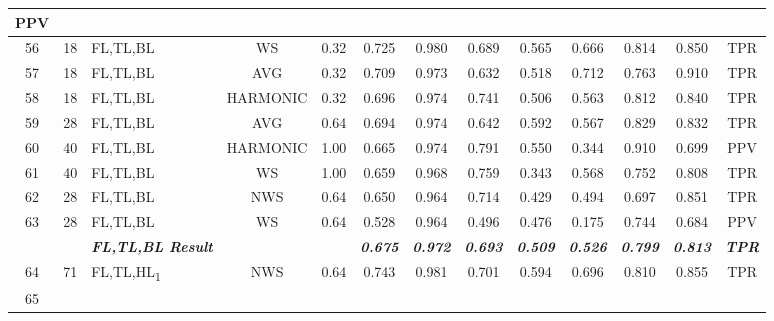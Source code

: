 \begin{table}[H]
{\begin{tabular}{cc|l|cc|c|c|c|c|c|c|c|c|}
    PPV \\ \hline
  \multicolumn{1}{|c|}{56} &
    18 &
    FL,TL,BL &
    \multicolumn{1}{c|}{WS} &
    0.32 &
    0.725 &
    0.980 &
    0.689 &
    0.565 &
    0.666 &
    0.814 &
    0.850 &
    TPR \\ \hline
  \multicolumn{1}{|c|}{57} &
    18 &
    FL,TL,BL &
    \multicolumn{1}{c|}{AVG} &
    0.32 &
    0.709 &
    0.973 &
    0.632 &
    0.518 &
    0.712 &
    0.763 &
    0.910 &
    TPR \\ \hline
  \multicolumn{1}{|c|}{58} &
    18 &
    FL,TL,BL &
    \multicolumn{1}{c|}{HARMONIC} &
    0.32 &
    0.696 &
    0.974 &
    0.741 &
    0.506 &
    0.563 &
    0.812 &
    0.840 &
    TPR \\ \hline
  \multicolumn{1}{|c|}{59} &
    28 &
    FL,TL,BL &
    \multicolumn{1}{c|}{AVG} &
    0.64 &
    0.694 &
    0.974 &
    0.642 &
    0.592 &
    0.567 &
    0.829 &
    0.832 &
    TPR \\ \hline
  \multicolumn{1}{|c|}{60} &
    40 &
    FL,TL,BL &
    \multicolumn{1}{c|}{HARMONIC} &
    1.00 &
    0.665 &
    0.974 &
    0.791 &
    0.550 &
    0.344 &
    0.910 &
    0.699 &
    PPV \\ \hline
  \multicolumn{1}{|c|}{61} &
    40 &
    FL,TL,BL &
    \multicolumn{1}{c|}{WS} &
    1.00 &
    0.659 &
    0.968 &
    0.759 &
    0.343 &
    0.568 &
    0.752 &
    0.808 &
    TPR \\ \hline
  \multicolumn{1}{|c|}{62} &
    28 &
    FL,TL,BL &
    \multicolumn{1}{c|}{NWS} &
    0.64 &
    0.650 &
    0.964 &
    0.714 &
    0.429 &
    0.494 &
    0.697 &
    0.851 &
    TPR \\ \hline
  \multicolumn{1}{|c|}{63} &
    28 &
    FL,TL,BL &
    \multicolumn{1}{c|}{WS} &
    0.64 &
    0.528 &
    0.964 &
    0.496 &
    0.476 &
    0.175 &
    0.744 &
    0.684 &
    PPV \\ \hline
   &
    \textit{\textbf{}} &
    \textit{\textbf{FL,TL,BL Result}} &
     &
     &
    \textit{\textbf{0.675}} &
    \textit{\textbf{0.972}} &
    \textit{\textbf{0.693}} &
    \textit{\textbf{0.509}} &
    \textit{\textbf{0.526}} &
    \textit{\textbf{0.799}} &
    \textit{\textbf{0.813}} &
    \textit{\textbf{TPR}} \\ \hline
  \multicolumn{1}{|c|}{64} &
    71 &
    FL,TL,HL\textsubscript{1} &
    \multicolumn{1}{c|}{NWS} &
    0.64 &
    0.743 &
    0.981 &
    0.701 &
    0.594 &
    0.696 &
    0.810 &
    0.855 &
    TPR \\ \hline
  \multicolumn{1}{|c|}{65} &

\end{tabular}}
\end{table}
